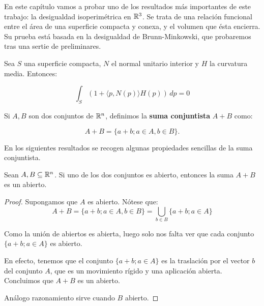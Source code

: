 \label{chapter:isoperimetricinequality}
En este capítulo vamos a probar uno de los resultados más importantes de este trabajo: la desigualdad isoperimétrica en $\mathbb{R}^3$. Se trata de una relación funcional entre el área de una superficie compacta y conexa, y el volumen que ésta encierra. Su prueba está basada en la desigualdad de Brunn-Minkowski, que probaremos tras una sertie de preliminares.

\begin{theorem}\label{formulaminkowski}
Sea $S$ una superficie compacta, $N$ el normal unitario interior y $H$ la curvatura media. Entonces:

\begin{equation*}
    \int_S (1+ \langle p, N(p) \rangle H(p)) \, dp = 0
\end{equation*}
\end{theorem}

\begin{definition}
Si $A, B$ son dos conjuntos de $\mathbb{R}^n$, definimos la \textbf{suma conjuntista} $A+B$ como:

\begin{equation*}
    A+B = \{a+b; a \in A, b \in B\}.
\end{equation*}
\end{definition}

En los siguientes resultados se recogen algunas propiedades sencillas de la suma conjuntista.

\begin{lemma}
Sean $A,B \subseteq \mathbb{R}^n$. Si uno de los dos conjuntos es abierto, entonces la suma $A+B$ es un abierto.
\end{lemma}
\begin{proof}
Supongamos que $A$ es abierto. Nótese que:
\begin{equation*}
    A + B = \{a+b; a \in A, b \in B\} = \bigcup_{b \in B} \{a+b; a \in A\}
\end{equation*}

Como la unión de abiertos es abierta, luego solo nos falta ver que cada conjunto $\{a+b; a \in A\}$ es abierto.

En efecto, tenemos que el conjunto $\{a+b; a \in A\}$ es la traslación por el vector $b$ del conjunto $A$, que es un movimiento rígido y una aplicación abierta. Concluimos que $A+B$ es un abierto.

Análogo razonamiento sirve cuando $B$ abierto.
\end{proof}



